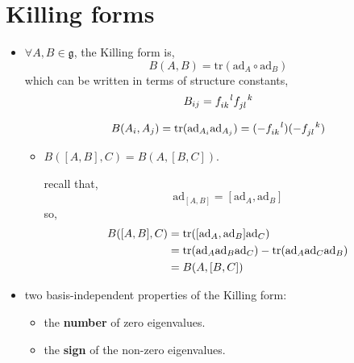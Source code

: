 \section{Killing forms}
\begin{itemize}
	\item $\forall A, B \in \mathfrak{g}$, the Killing form is,
	\begin{equation}
		B(A, B) = \mathrm{tr}(\mathrm{ad}_A \circ \mathrm{ad}_B)
	\end{equation}
	which can be written in terms of structure constants,
	\begin{equation}
		B_{i j} = \tensor{f}{_{i k}^l} \tensor{f}{_{j l}^k}
	\end{equation}
	
	\begin{tcolorbox}[title=proof:]
		\begin{equation}
			B(A_i, A_j) = \mathrm{tr}(\mathrm{ad}_{A_i} \mathrm{ad}_{A_j}) = (- \tensor{f}{_{i k}^l}) (- \tensor{f}{_{j l}^k})
		\end{equation}
	\end{tcolorbox}
	
	\begin{itemize}
		\item $B([A, B], C) = B(A, [B, C])$.
		
		\begin{tcolorbox}[title=proof:]
			recall that,
			\begin{equation}
				\mathrm{ad}_{[A, B]} = [\mathrm{ad}_A, \mathrm{ad}_B]
			\end{equation}
			so,
			\begin{align}
				B([A, B], C) &= \mathrm{tr}([\mathrm{ad}_A, \mathrm{ad}_B] \mathrm{ad}_C) \notag \\
				&= \mathrm{tr}(\mathrm{ad}_A \mathrm{ad}_B \mathrm{ad}_C) - \mathrm{tr}(\mathrm{ad}_A \mathrm{ad}_C \mathrm{ad}_B) \notag \\
				&= B(A, [B, C])
			\end{align}
		\end{tcolorbox}
	\end{itemize}
	
	\item two basis-independent properties of the Killing form:
	\begin{itemize}
		\item the \textbf{number} of zero eigenvalues.
		
		\item the \textbf{sign} of the non-zero eigenvalues.
	\end{itemize}
	

\end{itemize}
